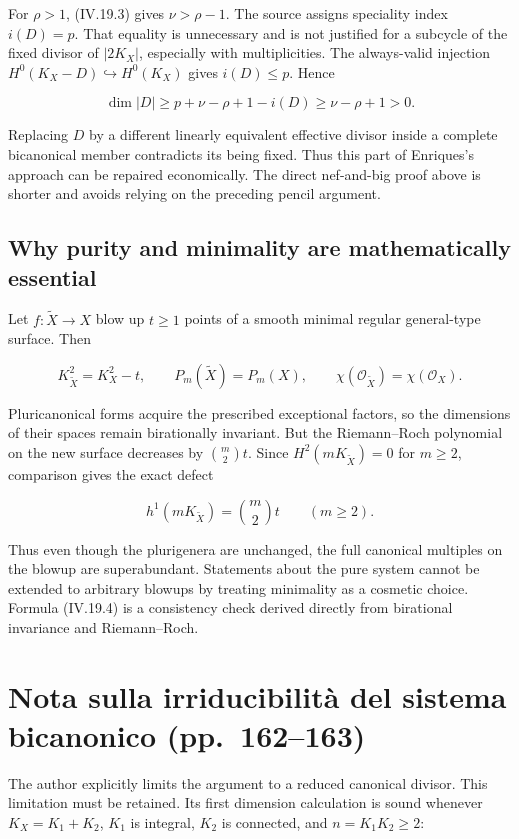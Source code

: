 For \(\rho>1\), (IV.19.3) gives \(\nu>\rho-1\). The source assigns speciality index \(i(D)=p\). That equality is unnecessary and is not justified for a subcycle of the fixed divisor of \(|2 K_X|\), especially with multiplicities. The always-valid injection \(H^0(K_X-D)\hookrightarrow H^0(K_X)\) gives \(i(D)\le p\). Hence

\[
\dim|D|\ge p+\nu-\rho+1-i(D)
\ge\nu-\rho+1>0.
\]

Replacing \(D\) by a different linearly equivalent effective divisor inside a complete bicanonical member contradicts its being fixed. Thus this part of Enriques's approach can be repaired economically. The direct nef-and-big proof above is shorter and avoids relying on the preceding pencil argument.

\subsection{Why purity and minimality are mathematically essential}

Let \(f:\widetilde X\to X\) blow up \(t\ge 1\) points of a smooth minimal regular general-type surface. Then

\[
K_{\widetilde X}^2=K_X^2-t,\qquad
P_m(\widetilde X)=P_m(X),\qquad
\chi(\mathcal O_{\widetilde X})=\chi(\mathcal O_X).
\]

Pluricanonical forms acquire the prescribed exceptional factors, so the dimensions of their spaces remain birationally invariant. But the Riemann--Roch polynomial on the new surface decreases by \(\binom m 2 t\). Since \(H^2(m K_{\widetilde X})=0\) for \(m\ge 2\), comparison gives the exact defect

\[
\boxed{h^1(mK_{\widetilde X})=\binom m2t\qquad(m\ge2).}
\tag{IV.19.4}
\]

Thus even though the plurigenera are unchanged, the full canonical multiples on the blowup are superabundant. Statements about the pure system cannot be extended to arbitrary blowups by treating minimality as a cosmetic choice. Formula (IV.19.4) is a consistency check derived directly from birational invariance and Riemann--Roch.

\section[Irriducibilità del bicanonico]{Nota sulla irriducibilità del sistema bicanonico (pp.~162--163)}\label{enriques-iv-20}

The author explicitly limits the argument to a reduced canonical divisor. This limitation must be retained. Its first dimension calculation is sound whenever \(K_X=K_1+K_2\), \(K_1\) is integral, \(K_2\) is connected, and \(n=K_1 K_2\ge 2\):

